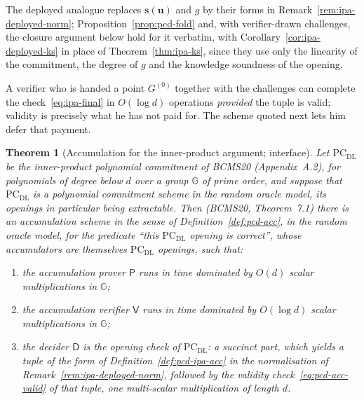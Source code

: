 \documentclass[11pt,a4paper]{article}
\newtheorem{theorem}{Theorem}[section]
\theoremstyle{definition}
\newcommand{\G}{\mathbb{G}}
\begin{document}
The deployed analogue replaces $\mathbf s(\mathbf u)$ and $g$ by their forms in
Remark~\ref{rem:ipa-deployed-norm}; Proposition~\ref{prop:pcd-fold} and, with
verifier-drawn challenges, the closure argument below hold for it verbatim, with
Corollary~\ref{cor:ipa-deployed-ks} in place of Theorem~\ref{thm:ipa-ks}, since
they use only the linearity of the commitment, the degree of $g$ and the
knowledge soundness of the opening.

A verifier who is handed a point $G^{(0)}$ together with the challenges
can complete the check~\eqref{eq:ipa-final} in $O(\log d)$ operations
\emph{provided} the tuple is valid; validity is precisely what he has
not paid for. The scheme quoted next lets him defer that payment.

\begin{theorem}[Accumulation for the inner-product argument; interface]
\label{thm:pcd-bcms}
Let $\mathrm{PC}_{\mathrm{DL}}$ be the inner-product polynomial
commitment of BCMS20 (Appendix~A.2), for polynomials of degree below
$d$ over a group $\G$ of prime order, and suppose that
$\mathrm{PC}_{\mathrm{DL}}$ is a polynomial commitment scheme in the
random oracle model, its openings in particular being extractable. Then
(BCMS20, Theorem~7.1) there is an accumulation scheme in the sense of
Definition~\ref{def:pcd-acc}, in the random oracle model, for the
predicate ``this $\mathrm{PC}_{\mathrm{DL}}$ opening is correct'',
whose accumulators are themselves $\mathrm{PC}_{\mathrm{DL}}$ openings,
such that:
\begin{enumerate}[leftmargin=*, itemsep=2pt]
\item the accumulation prover $\mathsf P$ runs in time dominated by
  $O(d)$ scalar multiplications in $\G$;
\item the accumulation verifier $\mathsf V$ runs in time dominated by
  $O(\log d)$ scalar multiplications in $\G$;
\item the decider $\mathsf D$ is the opening check of
  $\mathrm{PC}_{\mathrm{DL}}$: a succinct part, which yields a tuple of
  the form of Definition~\ref{def:pcd-ipa-acc} in the normalisation of
  Remark~\ref{rem:ipa-deployed-norm}, followed by the validity
  check~\eqref{eq:pcd-acc-valid} of that tuple, one multi-scalar
  multiplication of length $d$.
\end{enumerate}
\end{theorem}
\end{document}
